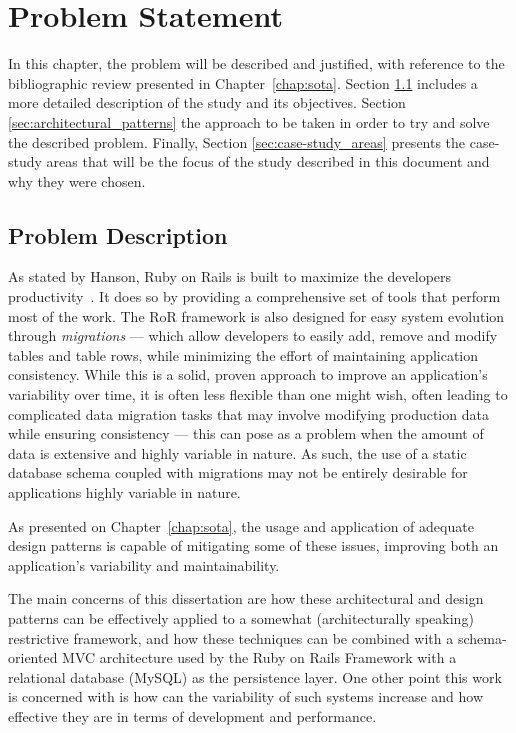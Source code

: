 \chapter{Problem Statement}\label{chap:problem_statement}

In this chapter, the problem will be described and justified, with reference to the bibliographic review presented in Chapter~\ref{chap:sota}. Section \ref{sec:problem_description} includes a more detailed description of the study and its objectives. Section \ref{sec:architectural_patterns} the approach to be taken in order to try and solve the described problem. Finally, Section \ref{sec:case-study_areas} presents the case-study areas that will be the focus of the study described in this document and why they were chosen.

\section{Problem Description}\label{sec:problem_description}

As stated by Hanson, Ruby on Rails is built to maximize the developers productivity~\cite{rubyonrails}. It does so by providing a comprehensive set of tools that perform most of the work. The RoR framework is also designed for easy system evolution through \emph{migrations} --- which allow developers to easily add, remove and modify tables and table rows, while minimizing the effort of maintaining application consistency. While this is a solid, proven approach to improve an application's variability over time, it is often less flexible than one might wish, often leading to complicated data migration tasks that may involve modifying production data while ensuring consistency --- this can pose as a problem when the amount of data is extensive and highly variable in nature. As such, the use of a static database schema coupled with migrations may not be entirely desirable for applications highly variable in nature.

As presented on Chapter~\ref{chap:sota}, the usage and application of adequate design patterns is capable of mitigating some of these issues, improving both an application's variability and maintainability.

The main concerns of this dissertation are how these architectural and design patterns can be effectively applied to a somewhat (architecturally speaking) restrictive framework, and how these techniques can be combined with a schema-oriented MVC architecture used by the Ruby on Rails Framework with a relational database (MySQL) as the persistence layer. One other point this work is concerned with is how can the variability of such systems increase and how effective they are in terms of development and performance.

